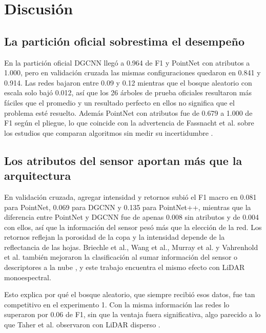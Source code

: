 \documentclass[preprint,12pt]{elsarticle}
\begin{document}
\section{Discusión}
\label{sec:discusion}

\subsection{La partición oficial sobrestima el desempeño}

En la partición oficial DGCNN llegó a 0.964 de F1 y PointNet con atributos a 1.000, pero en validación cruzada las mismas configuraciones quedaron en 0.841 y 0.914. Las redes bajaron entre 0.09 y 0.12 mientras que el bosque aleatorio con escala solo bajó 0.012, así que los 26 árboles de prueba oficiales resultaron más fáciles que el promedio y un resultado perfecto en ellos no significa que el problema esté resuelto. Además PointNet con atributos fue de 0.679 a 1.000 de F1 según el pliegue, lo que coincide con la advertencia de Fassnacht et al. sobre los estudios que comparan algoritmos sin medir su incertidumbre \cite{fassnacht2016review}.

\subsection{Los atributos del sensor aportan más que la arquitectura}

En validación cruzada, agregar intensidad y retornos subió el F1 macro en 0.081 para PointNet, 0.069 para DGCNN y 0.135 para PointNet++, mientras que la diferencia entre PointNet y DGCNN fue de apenas 0.008 sin atributos y de 0.004 con ellos, así que la información del sensor pesó más que la elección de la red. Los retornos reflejan la porosidad de la copa y la intensidad depende de la reflectancia de las hojas. Briechle et al., Wang et al., Murray et al. y Vahrenhold et al. también mejoraron la clasificación al sumar información del sensor o descriptores a la nube \cite{briechle2020pointnetpp,wang2024rse,murray2025dualstream,vahrenhold2025mmtscnet}, y este trabajo encuentra el mismo efecto con LiDAR monoespectral.

Esto explica por qué el bosque aleatorio, que siempre recibió esos datos, fue tan competitivo en el experimento 1. Con la misma información las redes lo superaron por 0.06 de F1, sin que la ventaja fuera significativa, algo parecido a lo que Taher et al. observaron con LiDAR disperso \cite{taher2026msals}.
\end{document}
